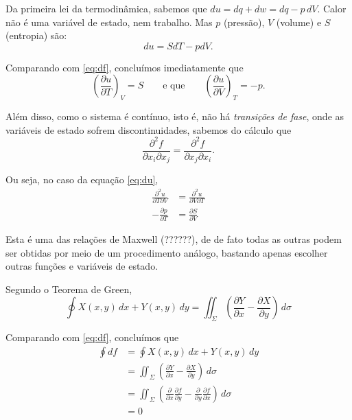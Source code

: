 \documentclass[a4paper,12pt]{article}
\begin{document}
  Da primeira lei da termodinâmica, sabemos que $du = dq + dw = dq - p\,dV$. Calor não é uma variável de estado, nem trabalho. Mas $p$ (pressão), $V$ (volume) e $S$ (entropia) são:
  \begin{equation}\label{eq:du}
    du = S dT - p dV.
  \end{equation}
  
  Comparando com \eqref{eq:df}, concluímos imediatamente que
  \begin{equation}
    \left(\frac{\partial u}{\partial T}\right)_V = S \qquad\text{e que}\qquad \left(\frac{\partial u}{\partial V}\right)_T = -p.
  \end{equation}

  Além disso, como o sistema é contínuo, isto é, não há \emph{transições de fase}, onde as variáveis de estado sofrem discontinuidades, sabemos do cálculo que
  \begin{equation}
    \frac{\partial^2 f}{\partial x_i\partial x_j} = \frac{\partial^2 f}{\partial x_j\partial x_i}.
  \end{equation}
  
  Ou seja, no caso da equação \ref{eq:du},
  \begin{align}
    \frac{\partial^2 u}{\partial T\partial V} &= \frac{\partial^2 u}{\partial V\partial T} \\
    -\frac{\partial p}{\partial T} &= \frac{\partial S}{\partial V}
  \end{align}

  Esta é uma das relações de Maxwell (??????), de de fato todas as outras podem ser obtidas por meio de um procedimento análogo,
  bastando apenas escolher outras funções e variáveis de estado.
  
  Segundo o Teorema de Green,
  \begin{equation}
    \oint X(x,y)\, dx + Y(x,y)\, dy = \iint_{\Sigma} \left(\frac{\partial Y}{\partial x} - \frac{\partial X}{\partial y}\right)\, d\sigma
  \end{equation}
  
  Comparando com \eqref{eq:df}, concluímos que
  \begin{align}
    \oint df &= \oint X(x,y)\, dx + Y(x,y)\, dy\\
             &= \iint_{\Sigma} \left(\frac{\partial Y}{\partial x} - \frac{\partial X}{\partial y}\right)\, d\sigma\\
             &= \iint_{\Sigma} \left(\frac{\partial}{\partial x}\frac{\partial f}{\partial y} - \frac{\partial}{\partial y}\frac{\partial f}{\partial x}\right)\, d\sigma\\
             &= 0
  \end{align}





  
  
\end{document}
